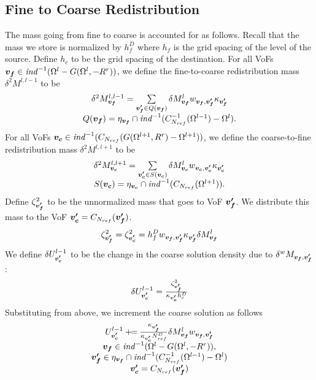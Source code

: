 \subsection{Fine to Coarse Redistribution}

The mass going from fine to coarse is accounted for as follows.
Recall that the mass we store is normalized by $h^D_f$ where
$h_f$ is the grid spacing of the level of the source.  Define 
$h_c$ to be the grid spacing of the destination.
For all VoFs 
${\boldsymbol{v_f}} \in {\it ind}^{-1}(\Omega^{l}-G(\Omega^{l}, -R^r))$,
we define the fine-to-coarse redistribution mass $\delta^2 M^{l,l-1}$
to be 
\begin{equation}
\begin{array}{c}
\delta^2 M^{l,l-1}_{{\boldsymbol{v_f}}} = 
\sum\limits_{{\boldsymbol{v'_f}} \in Q({\boldsymbol{v_f}})}  \delta M^l_{{\boldsymbol{v_f}}}
w_{{\boldsymbol{v_f}},{\boldsymbol{v'_f}}} \kappa_{\boldsymbol{v'_f}}
\\
Q({\boldsymbol{v_f}}) = \eta_{{\boldsymbol{v_f}}} \cap 
{\it ind}^{-1}(C^{-1}_{{{N}_{ref}}}(\Omega^{l-1}) - \Omega^{l}).
\end{array}
\end{equation}
For all VoFs 
${\boldsymbol{v_c}} \in {\it ind}^{-1}(C_{{{N}_{ref}}}(G(\Omega^{l+1}, R^r) - \Omega^{l+1}))$,
we define the coarse-to-fine redistribution mass $\delta^2 M^{l,l+1}$
to be 
\begin{equation}
\begin{array}{c}
\delta^2 M^{l,l+1}_{{\boldsymbol{v_c}}} = 
\sum\limits_{{\boldsymbol{v'_c}} \in S({\boldsymbol{v_c}})}  \delta M^l_{{\boldsymbol{v_c}}}
w_{{\boldsymbol{v_c}},{\boldsymbol{v'_c}}} \kappa_{\boldsymbol{v'_c}}
\\
S({\boldsymbol{v_c}}) = \eta_{{\boldsymbol{v_c}}} \cap {\it ind}^{-1}(C_{{{N}_{ref}}}(\Omega^{l+1})).
\end{array}
\label{eqn::ctofredist2}
\end{equation}
Define $\zeta^2_{\boldsymbol{v'_f}}$ to be the unnormalized mass that goes
to VoF ${\boldsymbol{v'_f}}$.   We distribute this mass to the VoF 
${\boldsymbol{v'_c}} = C_{{N}_{ref}}({\boldsymbol{v'_f}})$.
\begin{equation}
\zeta^2_{\boldsymbol{v'_f}} = \zeta^2_{\boldsymbol{v'_c}} = h^D_f w_{{\boldsymbol{v_f}},{\boldsymbol{v'_f}}} \kappa_{\boldsymbol{v'_f}}
  \delta M^l_{{\boldsymbol{v_f}}} 
\end{equation}
We define $\delta U^{l-1}_{\boldsymbol{v'_c}}$ to be the change in 
the coarse solution density
due to $\delta^w M_{{\boldsymbol{v_f}}, {\boldsymbol{v'_f}}}$:
\begin{equation}
\begin{array}{c}
\delta U^{l-1}_{{\boldsymbol{v'_c}}} = 
\frac{\zeta^2_{\boldsymbol{v'_f}}}{\kappa_{{\boldsymbol{v'_c}}} h^D_c} 
\end{array}
\end{equation}
Substituting from above, we  increment 
the coarse solution as follows
\begin{equation}
\begin{array}{c}
U^{l-1}_{{\boldsymbol{v'_c}}} \mathbin{+\mkern-7mu=}  
\frac{\kappa_{\boldsymbol{v'_f}}}{\kappa_{\boldsymbol{v'_c}} N^D_{ref}}  
\delta M^l_{{\boldsymbol{v_f}}} w_{{\boldsymbol{v_f}},{\boldsymbol{v'_f}}}\\
{\boldsymbol{v_f}} \in {\it ind}^{-1}(\Omega^{l}-G(\Omega^{l}, -R^r)),\\
{\boldsymbol{v'_f}} \in \eta_{{\boldsymbol{v_f}}} \cap 
{\it ind}^{-1}(C^{-1}_{{{N}_{ref}}}(\Omega^{l-1}) - \Omega^{l}) \\
{\boldsymbol{v'_c}} = C_{{N}_{ref}}({\boldsymbol{v'_f}})
\end{array}
\end{equation}

